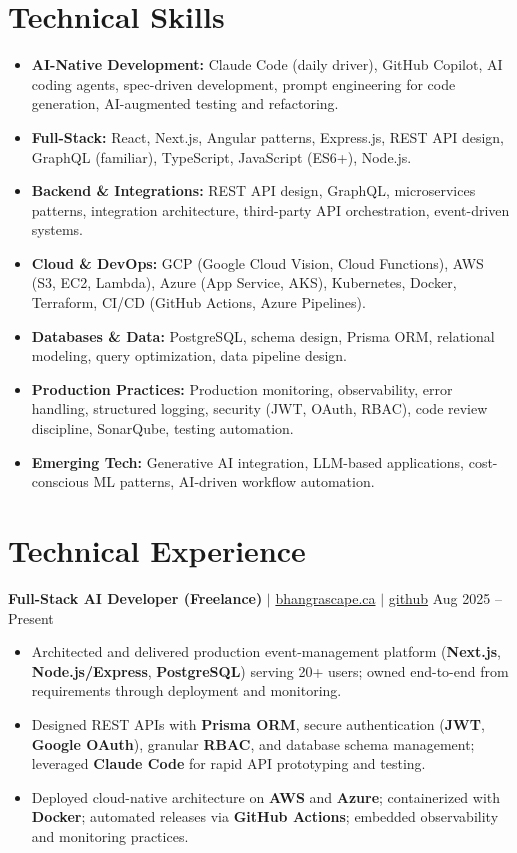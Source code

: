 \documentclass[11pt,a4paper]{article}
\begin{document}
\section{Technical Skills}
\begin{itemize}
    \item \textbf{AI-Native Development:} Claude Code (daily driver), GitHub Copilot, AI coding agents, spec-driven development, prompt engineering for code generation, AI-augmented testing and refactoring.
    \item \textbf{Full-Stack:} React, Next.js, Angular patterns, Express.js, REST API design, GraphQL (familiar), TypeScript, JavaScript (ES6+), Node.js.
    \item \textbf{Backend \& Integrations:} REST API design, GraphQL, microservices patterns, integration architecture, third-party API orchestration, event-driven systems.
    \item \textbf{Cloud \& DevOps:} GCP (Google Cloud Vision, Cloud Functions), AWS (S3, EC2, Lambda), Azure (App Service, AKS), Kubernetes, Docker, Terraform, CI/CD (GitHub Actions, Azure Pipelines).
    \item \textbf{Databases \& Data:} PostgreSQL, schema design, Prisma ORM, relational modeling, query optimization, data pipeline design.
    \item \textbf{Production Practices:} Production monitoring, observability, error handling, structured logging, security (JWT, OAuth, RBAC), code review discipline, SonarQube, testing automation.
    \item \textbf{Emerging Tech:} Generative AI integration, LLM-based applications, cost-conscious ML patterns, AI-driven workflow automation.
\end{itemize}

\section{Technical Experience}

\textbf{Full-Stack AI Developer (Freelance)} $|$ \href{https://bhangrascape.ca}{bhangrascape.ca} $|$ \href{https://github.com/bhat0155/bhangraescape}{\small github} \hfill Aug 2025 -- Present
\begin{itemize}
    \item Architected and delivered production event-management platform (\textbf{Next.js}, \textbf{Node.js/Express}, \textbf{PostgreSQL}) serving 20+ users; owned end-to-end from requirements through deployment and monitoring.
    \item Designed REST APIs with \textbf{Prisma ORM}, secure authentication (\textbf{JWT}, \textbf{Google OAuth}), granular \textbf{RBAC}, and database schema management; leveraged \textbf{Claude Code} for rapid API prototyping and testing.
    \item Deployed cloud-native architecture on \textbf{AWS} and \textbf{Azure}; containerized with \textbf{Docker}; automated releases via \textbf{GitHub Actions}; embedded observability and monitoring practices.
\end{itemize}
\end{document}
